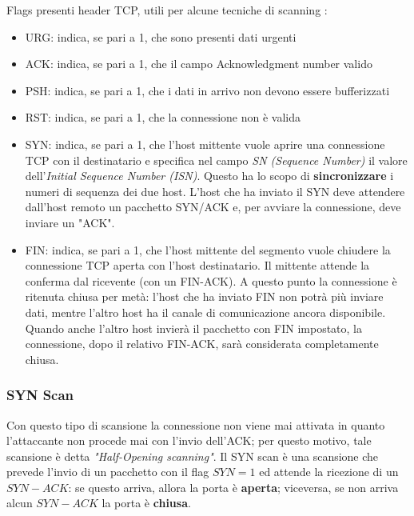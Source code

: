 Flags presenti header TCP, utili per alcune tecniche di scanning :
\begin{itemize}
    \item URG: indica, se pari a 1, che sono presenti dati urgenti
    \item ACK: indica, se pari a 1, che il campo Acknowledgment number valido
    \item PSH: indica, se pari a 1, che i dati in arrivo non devono essere bufferizzati
    \item RST: indica, se pari a 1, che la connessione non è valida
    \item SYN: indica, se pari a 1, che l'host mittente vuole aprire una connessione TCP con il destinatario e specifica nel campo \textit{SN (Sequence Number)} il valore dell'\textit{Initial Sequence Number (ISN)}. Questo ha lo scopo di \textbf{sincronizzare} i numeri di sequenza dei due host. L'host che ha inviato il SYN deve attendere dall'host remoto un pacchetto SYN/ACK e, per avviare la connessione, deve inviare un "ACK".
    \item FIN: indica, se pari a 1, che l'host mittente del segmento vuole chiudere la connessione TCP aperta con l'host destinatario. Il mittente attende la conferma dal ricevente (con un FIN-ACK). A questo punto la connessione è ritenuta chiusa per metà: l'host che ha inviato FIN non potrà più inviare dati, mentre l'altro host ha il canale di comunicazione ancora disponibile. Quando anche l'altro host invierà il pacchetto con FIN impostato, la connessione, dopo il relativo FIN-ACK, sarà considerata completamente chiusa.
\end{itemize}

\subsubsection{SYN Scan}
Con questo tipo di scansione la connessione non viene mai attivata in quanto l'attaccante non procede mai con l'invio dell'ACK; per questo motivo, tale scansione è detta \textit{"Half-Opening scanning"}. Il SYN scan è una scansione che prevede l'invio di un pacchetto con il flag $SYN=1$ ed attende la ricezione di un $SYN-ACK$: se questo arriva, allora la porta è \textbf{aperta}; viceversa, se non arriva alcun $SYN-ACK$ la porta è \textbf{chiusa}. 

